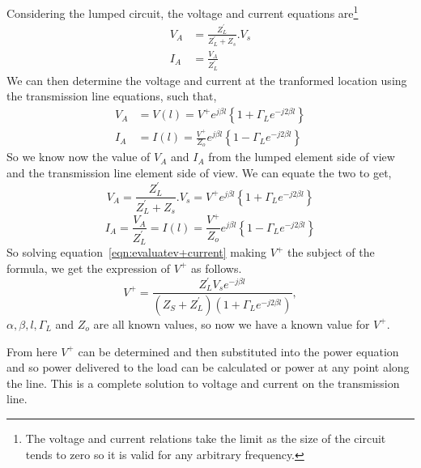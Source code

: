 Considering the lumped circuit, the voltage and current equations are\footnote{
The voltage and current relations take the limit as the size of the circuit tends to zero so it is valid for any arbitrary frequency.
}
\begin{align}
V_A &= \frac{Z^'_L}{Z^{'}_L + Z_s} . V_s\label{eqn:transimpvoltage}\\
I_A &= \frac{V_A}{Z^{'}_L}\label{eqn:transimpcurrent}
\end{align} 
We can then determine the voltage and current at the tranformed location using the transmission line equations, such that,
\begin{align*} 
V_A &= V(l) = V^+ e^{j\beta l} \left\lbrace 1 + \Gamma_L e^{-j2\beta l} \right\rbrace\\
I_A &= I(l) = \frac{V^+}{Z_o} e^{j\beta l} \left\lbrace 1 - \Gamma_L e^{-j2\beta l} \right\rbrace
\end{align*}
So we know now the value of $V_A$ and $I_A$ from the lumped element side of view and the transmission line element side of view. We can equate the two to get,
\begin{equation} 
V_A = \frac{Z^{'}_L}{Z^{'}_L + Z_s} . V_s = V^+ e^{j\beta l} \left\lbrace 1 + \Gamma_L e^{-j2\beta l} \right\rbrace\label{eqn:evaluatev+voltage}
\end{equation}
\begin{equation}
I_A = \frac{V_A}{Z^{'}_L} = I(l) = \frac{V^+}{Z_o} e^{j\beta l} \left\lbrace 1 - \Gamma_L e^{-j2\beta l} \right\rbrace
\label{eqn:evaluatev+current}
\end{equation}
So solving equation~\ref{eqn:evaluatev+current} making $V^{+}$ the subject of the formula, we get the expression of $V^+$ as follows. 
\begin{equation} 
V^+ = \frac{Z^{'}_L V_s e^{-j\beta l}}{(Z_S + Z^{'}_L)(1 + \Gamma_L e^{-j2\beta l })}, 
\end{equation}
$\alpha, \beta, l, \Gamma_L$ and $Z_o$ are all known values, so now we have a known value for $V^+$.

From here $V^+$ can be determined and then substituted into the power equation and so power delivered to the load can be calculated or power at any point along the line. This is a complete solution to voltage and current on the transmission line.

